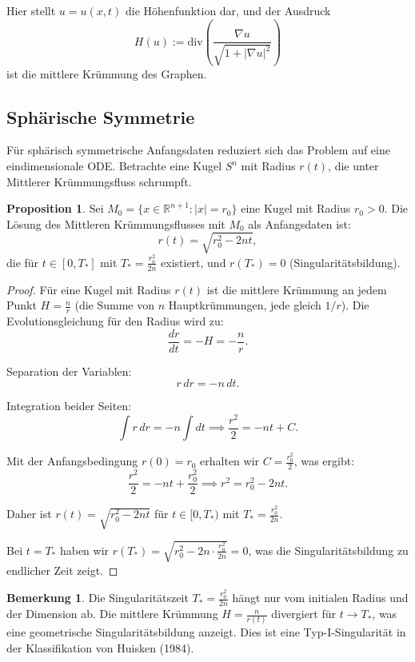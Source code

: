 \documentclass[a4paper,12pt]{article}
\theoremstyle{definition}
\newtheorem{bemerkung}{Bemerkung}
\newtheorem{proposition}{Proposition}
\begin{document}
Hier stellt $u = u(x, t)$ die Höhenfunktion dar, und der Ausdruck
\[
H(u) := \text{div}\left( \frac{\nabla u}{\sqrt{1 + |\nabla u|^2}} \right)
\]
ist die mittlere Krümmung des Graphen.

\subsection{Sphärische Symmetrie}

Für sphärisch symmetrische Anfangsdaten reduziert sich das Problem auf eine eindimensionale ODE. Betrachte eine Kugel $S^n$ mit Radius $r(t)$, die unter Mittlerer Krümmungsfluss schrumpft.

\begin{proposition}
	Sei $M_0 = \{x \in \mathbb{R}^{n+1} : |x| = r_0\}$ eine Kugel mit Radius $r_0 > 0$. Die Lösung des Mittleren Krümmungsflusses mit $M_0$ als Anfangsdaten ist:
	\[
	r(t) = \sqrt{r_0^2 - 2nt},
	\]
	die für $t \in [0, T_*]$ mit $T_* = \frac{r_0^2}{2n}$ existiert, und $r(T_*) = 0$ (Singularitätsbildung).
\end{proposition}

\begin{proof}
	Für eine Kugel mit Radius $r(t)$ ist die mittlere Krümmung an jedem Punkt $H = \frac{n}{r}$ (die Summe von $n$ Hauptkrümmungen, jede gleich $1/r$). Die Evolutionsgleichung für den Radius wird zu:
	\[
	\frac{dr}{dt} = -H = -\frac{n}{r}.
	\]
	
	Separation der Variablen:
	\[
	r \, dr = -n \, dt.
	\]
	
	Integration beider Seiten:
	\[
	\int r \, dr = -n \int dt \implies \frac{r^2}{2} = -nt + C.
	\]
	
	Mit der Anfangsbedingung $r(0) = r_0$ erhalten wir $C = \frac{r_0^2}{2}$, was ergibt:
	\[
	\frac{r^2}{2} = -nt + \frac{r_0^2}{2} \implies r^2 = r_0^2 - 2nt.
	\]
	
	Daher ist $r(t) = \sqrt{r_0^2 - 2nt}$ für $t \in [0, T_*)$ mit $T_* = \frac{r_0^2}{2n}$.
	
	Bei $t = T_*$ haben wir $r(T_*) = \sqrt{r_0^2 - 2n \cdot \frac{r_0^2}{2n}} = 0$, was die Singularitätsbildung zu endlicher Zeit zeigt.
\end{proof}

\begin{bemerkung}
	Die Singularitätszeit $T_* = \frac{r_0^2}{2n}$ hängt nur vom initialen Radius und der Dimension ab. Die mittlere Krümmung $H = \frac{n}{r(t)}$ divergiert für $t \to T_*$, was eine geometrische Singularitätsbildung anzeigt. Dies ist eine Typ-I-Singularität in der Klassifikation von Huisken (1984).
\end{bemerkung}
\end{document}
